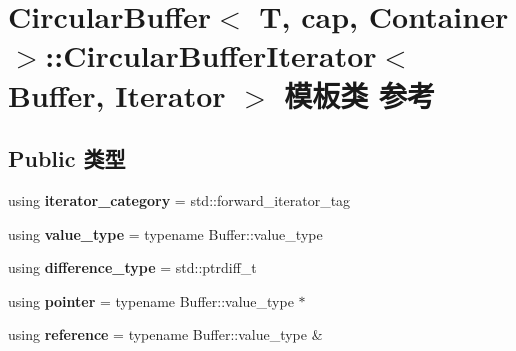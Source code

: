 \hypertarget{class_circular_buffer_1_1_circular_buffer_iterator}{}\section{Circular\+Buffer$<$ T, cap, Container $>$\+::Circular\+Buffer\+Iterator$<$ Buffer, Iterator $>$ 模板类 参考}
\label{class_circular_buffer_1_1_circular_buffer_iterator}
\subsection*{Public 类型}
\begin{DoxyCompactItemize}
\item 
\mbox{\label{class_circular_buffer_1_1_circular_buffer_iterator_ae0d1315e83c13ae486c3f97c5b3ccc9a}} 
using {\bfseries iterator\+\_\+category} = std\+::forward\+\_\+iterator\+\_\+tag
\item 
\mbox{\label{class_circular_buffer_1_1_circular_buffer_iterator_a7183b727367a6daca168109b25a0da96}} 
using {\bfseries value\+\_\+type} = typename Buffer\+::value\+\_\+type
\item 
\mbox{\label{class_circular_buffer_1_1_circular_buffer_iterator_ab51b23fab2770716f7d43fc0b9e0f6c0}} 
using {\bfseries difference\+\_\+type} = std\+::ptrdiff\+\_\+t
\item 
\mbox{\label{class_circular_buffer_1_1_circular_buffer_iterator_adb887041460641224d0f98e178c4d36e}} 
using {\bfseries pointer} = typename Buffer\+::value\+\_\+type $\ast$
\item 
\mbox{\label{class_circular_buffer_1_1_circular_buffer_iterator_a30055df1631b1db06c18fa2d33466a4a}} 
using {\bfseries reference} = typename Buffer\+::value\+\_\+type \&
\end{DoxyCompactItemize}
